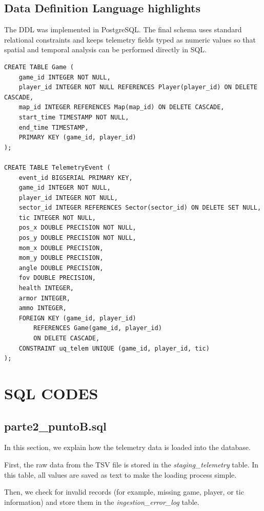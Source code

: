 \documentclass[11pt]{article}
\begin{document}
\subsection{Data Definition Language highlights}
The DDL was implemented in PostgreSQL. The final schema uses standard relational constraints and keeps telemetry fields typed as numeric values so that spatial and temporal analysis can be performed directly in SQL.

\begin{lstlisting}[style=sqlstyle]
CREATE TABLE Game (
    game_id INTEGER NOT NULL,
    player_id INTEGER NOT NULL REFERENCES Player(player_id) ON DELETE CASCADE,
    map_id INTEGER REFERENCES Map(map_id) ON DELETE CASCADE,
    start_time TIMESTAMP NOT NULL,
    end_time TIMESTAMP,
    PRIMARY KEY (game_id, player_id)
);

CREATE TABLE TelemetryEvent (
    event_id BIGSERIAL PRIMARY KEY,
    game_id INTEGER NOT NULL,
    player_id INTEGER NOT NULL,
    sector_id INTEGER REFERENCES Sector(sector_id) ON DELETE SET NULL,
    tic INTEGER NOT NULL,
    pos_x DOUBLE PRECISION NOT NULL,
    pos_y DOUBLE PRECISION NOT NULL,
    mom_x DOUBLE PRECISION,
    mom_y DOUBLE PRECISION,
    angle DOUBLE PRECISION,
    fov DOUBLE PRECISION,
    health INTEGER,
    armor INTEGER,
    ammo INTEGER,
    FOREIGN KEY (game_id, player_id)
        REFERENCES Game(game_id, player_id)
        ON DELETE CASCADE,
    CONSTRAINT uq_telem UNIQUE (game_id, player_id, tic)
);
\end{lstlisting}

\section{SQL CODES}

\subsection{parte2\_puntoB.sql}

In this section, we explain how the telemetry data is loaded into the database.

\smallskip
First, the raw data from the TSV file is stored in the \textit{staging\_telemetry} table. In this table, all values are saved as text to make the loading process simple.

\smallskip
Then, we check for invalid records (for example, missing game, player, or tic information) and store them in the \textit{ingestion\_error\_log }table.
\end{document}
